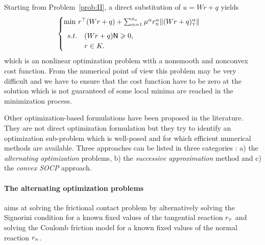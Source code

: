 Starting from Problem~\ref{prob:II}, a direct substitution of $u = Wr +q$ yields
\begin{equation}
  \label{eq:opt-3}
  \begin{cases}
    \min\, r^\top (Wr+q) + \sum _{\alpha=1}^{n_c} \mu^\alpha r_\n^\alpha \|(Wr+q)_\t^\alpha\| \\[2mm]
    \begin{array}{ll}
      s.t. &(W r + q){\sf N} \geq 0, \\
      &r \in K.
    \end{array}
  \end{cases}
\end{equation}
which is an nonlinear optimization problem with a nonsmooth and nonconvex cost function.  From the numerical point of view this problem may be very difficult and we have to ensure that the cost function have to be zero at the solution which is not guaranteed of some local minima are reached in the minimization process.

Other optimization-based formulations have been proposed in the literature. They are not direct optimization formulation but they try to identify an optimization sub-problem which is well-posed and for which efficient numerical methods are available. Three approaches can be listed in three categories : a)  the \emph{alternating optimization} problems, b) the \emph{successive approximation} method and c)  the \emph{convex SOCP} approach.


\paragraph{The alternating optimization problems} aims at solving the frictional contact problem by alternatively solving the Signorini condition for a known fixed values of the tangential reaction $r_{\hbox{\tiny{T}}}$ and solving the Coulomb friction model for a known fixed values of the normal reaction $r_{\hbox{\tiny{N}}}$. 

